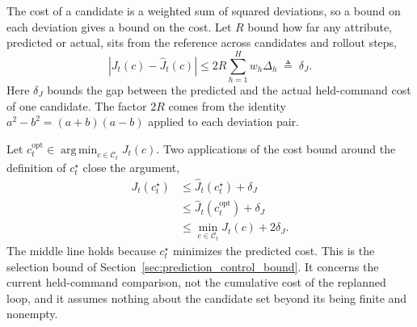 The cost of a candidate is a weighted sum of squared deviations, so a bound on
each deviation gives a bound on the cost. Let $R$ bound how far any attribute,
predicted or actual, sits from the reference across candidates and rollout
steps,
\begin{equation}
    \left|
        J_t(c)-\widehat{J}_t(c)
    \right|
    \leq
    2R\sum_{h=1}^{H}w_h\Delta_h
    \;\triangleq\;\delta_J .
    \label{eq:cost_bound}
\end{equation}
Here $\delta_J$ bounds the gap between the predicted and the actual
held-command cost of one candidate. The factor $2R$ comes from the identity
$a^2-b^2=(a+b)(a-b)$ applied to each deviation pair.

Let $c_t^{\mathrm{opt}}\in\operatorname*{arg\,min}_{c\in\mathcal{C}_t}J_t(c)$.
Two applications of the cost bound around the definition of $c_t^{\star}$
close the argument,
\begin{equation}
    \begin{aligned}
        J_t(c_t^{\star})
        &\leq
        \widehat{J}_t(c_t^{\star})+\delta_J\\
        &\leq
        \widehat{J}_t(c_t^{\mathrm{opt}})+\delta_J\\
        &\leq
        \min_{c\in\mathcal{C}_t}J_t(c)+2\delta_J.
    \end{aligned}
    \label{eq:selection_bound_proof}
\end{equation}
The middle line holds because $c_t^{\star}$ minimizes the predicted cost. This
is the selection bound of Section~\ref{sec:prediction_control_bound}. It concerns the
current held-command comparison, not the cumulative cost of the replanned
loop, and it assumes nothing about the candidate set beyond its being finite
and nonempty.
